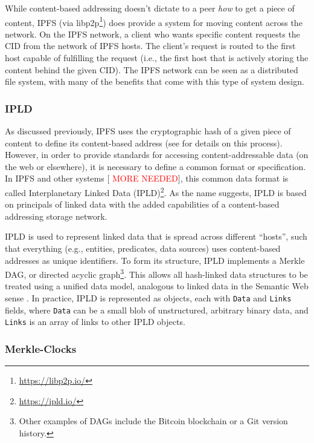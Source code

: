 \documentclass{textile}
\begin{document}
While content-based addressing doesn't dictate to a peer \emph{how} to get a piece of content, IPFS (via libp2p\footnote{\url{https://libp2p.io/}}) does provide a system for moving content across the network.  On the IPFS network, a client who wants specific content requests the CID from the network of IPFS hosts. The client's request is routed to the first host capable of fulfilling the request (i.e., the first host that is actively storing the content behind the given CID). The IPFS network can be seen as a distributed file system, with many of the benefits that come with this type of system design.

\subsubsection{IPLD}

As discussed previously, IPFS uses the cryptographic hash of a given piece of content to define its content-based address (see \cite{benetIPFSContentAddressed2014} for details on this process). However, in order to provide standards for accessing content-addressable data (on the web or elsewhere), it is necessary to define a common format or specification. In IPFS and other systems [\cite[e.g.,][]{protocollabsFilecoinDecentralizedStorage2017} \textcolor{red}{MORE NEEDED}], this common data format is called Interplanetary Linked Data (IPLD)\footnote{\url{https://ipld.io/}}. As the name suggests, IPLD is based on principals of linked data \cite{berners-leeLinkedData2009,bizerLinkedDataStory2011} with the added capabilities of a content-based addressing storage network. 

IPLD is used to represent linked data that is spread across different ``hosts'', such that everything (e.g., entities, predicates, data sources) \cite{heathLinkedDataEvolving2011} uses content-based addresses as unique identifiers. To form its structure, IPLD implements a Merkle DAG, or directed acyclic graph\footnote{Other examples of DAGs include the Bitcoin blockchain or a Git version history.}. This allows all hash-linked data structures to be treated using a unified data model, analogous to linked data in the Semantic Web sense \cite{brendanobrienDeterministicQueryingDistributed2017}. In practice, IPLD is represented as objects, each with \texttt{Data} and \texttt{Links} fields, where \texttt{Data} can be a small blob of unstructured, arbitrary binary data, and \texttt{Links} is an array of links to other IPLD objects. 

\subsubsection{Merkle-Clocks} \label{sec:merkleclocks}
\end{document}
